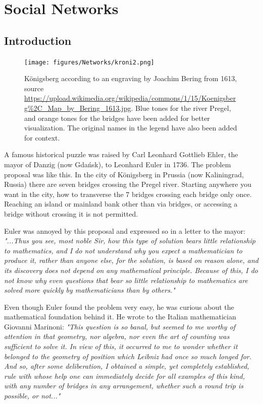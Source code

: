 \chapter{Social Networks}\label{ch:networks}

\section{Introduction}

    \begin{figure}[H]
        \centering
            \texttt{[image: figures/Networks/kroni2.png]} 
        \caption{Königsberg according to an engraving by Joachim Bering from 1613, source \url{https://upload.wikimedia.org/wikipedia/commons/1/15/Koenigsberg\%2C\_Map\_by\_Bering\_1613.jpg}. Blue tones for the river Pregel, and orange tones for the bridges have been added for better visualization. The original names in the legend have also been added for context.}
        \label{figure:networkBridges}
    \end{figure}


A famous historical puzzle was raised by Carl Leonhard Gottlieb Ehler, the mayor of Danzig (now Gdańsk), to Leonhard Euler in 1736. The problem proposal was like this. In the city of Königsberg in Prussia (now Kaliningrad, Russia) there are seven bridges crossing the Pregel river. Starting anywhere you want in the city, how to transverse the 7 bridges crossing each bridge only once. Reaching an island or mainland bank other than via bridges, or accessing a bridge without crossing it is not permitted.

Euler was annoyed by this proposal and expressed so in a letter to the mayor: \textit{"...Thus you see, most noble Sir, how this type of solution bears little relationship to mathematics, and I do not understand why you expect a mathematician to produce it, rather than anyone else, for the solution, is based on reason alone, and its discovery does not depend on any mathematical principle.  Because of this, I do not know why even questions that bear so little relationship to mathematics are solved more quickly by mathematicians than by others."}

Even though Euler found the problem very easy, he was curious about the mathematical foundation behind it. He wrote to the Italian mathematician Giovanni Marinoni: \textit{"This question is so banal, but seemed to me worthy of attention in that geometry, nor algebra, nor even the art of counting was sufficient to solve it. In view of this, it occurred to me to wonder whether it belonged to the geometry of position which Leibniz had once so much longed for. And so, after some deliberation, I obtained a simple, yet completely established, rule with whose help one can immediately decide for all examples of this kind, with any number of bridges in any arrangement, whether such a round trip is possible, or not..."}

